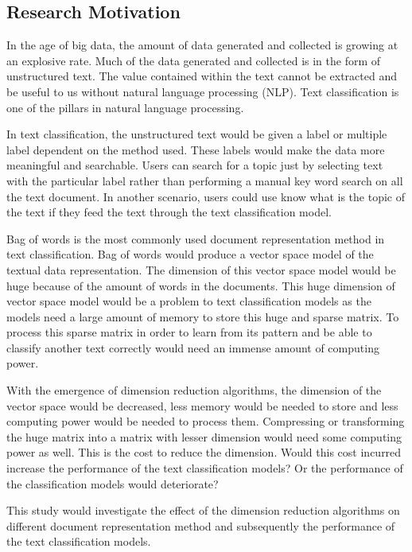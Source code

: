 \clearpage
\subsection{Research Motivation}
In the age of big data, the amount of data generated and collected is growing at an explosive rate. Much of the data generated and collected is in the form of unstructured text. The value contained within the text cannot be extracted and be useful to us without natural language processing (NLP). Text classification is one of the pillars in natural language processing.

In text classification, the unstructured text would be given a label or multiple label dependent on the method used. These labels would make the data more meaningful and searchable. Users can search for a topic just by selecting text with the particular label rather than performing a manual key word search on all the text document. In another scenario, users could use know what is the topic of the text if they feed the text through the text classification model.

Bag of words is the most commonly used document representation method in text classification. Bag of words would produce a vector space model of the textual data representation. The dimension of this vector space model would be huge because of the amount of words in the documents. This huge dimension of vector space model would be a problem to text classification models as the models need a large amount of memory to store this huge and sparse matrix. To process this sparse matrix in order to learn from its pattern and be able to classify another text correctly would need an immense amount of computing power.

With the emergence of dimension reduction algorithms, the dimension of the vector space would be decreased, less memory would be needed to store and less computing power would be needed to process them. Compressing or transforming the huge matrix into a matrix with lesser dimension would need some computing power as well. This is the cost to reduce the dimension. Would this cost incurred increase the performance of the text classification models? Or the performance of the classification models would deteriorate?

This study would investigate the effect of the dimension reduction algorithms on different document representation method and subsequently the performance of the text classification models.\\

